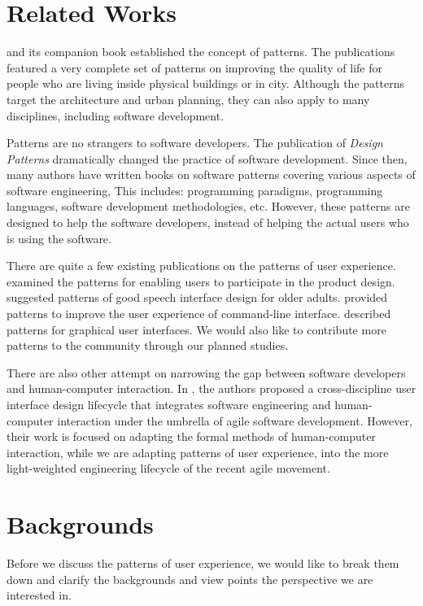 \documentclass[a4paper,titlepage]{article}
\begin{document}
\section{Related Works}
\label{sec:related}
\citet{language:alexander} and its companion book
\citet{timeless:alexander} established the concept of patterns. The
publications featured a very complete set of patterns on improving the
quality of life for people who are living inside physical buildings or
in city. Although the patterns target the architecture and urban
planning, they can also apply to many disciplines, including software
development.

Patterns are no strangers to software developers. The publication of
\textit{Design Patterns} \citep{patterns:gamma} dramatically changed
the practice of software development. Since then, many authors have
written books on software patterns covering various aspects of
software engineering, This includes: programming paradigms,
programming languages, software development methodologies,
etc. However, these patterns are designed to help the software
developers, instead of helping the actual users who is using the
software.

There are quite a few existing publications on the patterns of user
experience. \citet{participatory:dearden} examined the patterns for
enabling users to participate in the product design.
\citet{speech:zajicek} suggested patterns of good speech interface
design for older adults. \citet{unix:raymond} provided patterns to
improve the user experience of command-line interface.
\citet{patterns:tidwell} described patterns for graphical user
interfaces. We would also like to contribute more patterns to the
community through our planned studies.

There are also other attempt on narrowing the gap between software
developers and human-computer interaction. In \citet{agile:memmel},
the authors proposed a cross-discipline user interface design
lifecycle that integrates software engineering and human-computer
interaction under the umbrella of agile software development. However,
their work is focused on adapting the formal methods of human-computer
interaction, while we are adapting patterns of user experience, into
the more light-weighted engineering lifecycle of the recent agile
movement.


\section{Backgrounds}
\label{sec:backgrounds}
Before we discuss the patterns of user experience, we would like to
break them down and clarify the backgrounds and view points the
perspective we are interested in.
\end{document}
